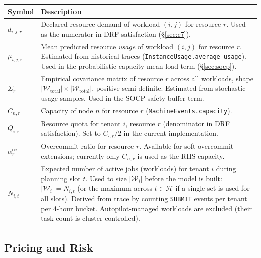 \documentclass[11pt,a4paper]{article}
\newcommand{\cW}{\mathcal{W}}           %
\newcommand{\cH}{\mathcal{H}}           %
\begin{document}
\begin{longtable}{@{}p{2.2cm}p{11.5cm}@{}}
  \toprule
  \textbf{Symbol} & \textbf{Description} \\
  \midrule
  \endhead
  $d_{i,j,r}$   & Declared resource demand of workload $(i,j)$ for resource $r$.
                   Used as the numerator in DRF satisfaction (\S\ref{sec:c7}). \\[4pt]
  $\mu_{i,j,r}$ & Mean predicted resource \emph{usage} of workload $(i,j)$ for
                   resource $r$.  Estimated from historical traces
                   (\texttt{InstanceUsage.average\_usage}).
                   Used in the probabilistic capacity mean-load term (\S\ref{sec:socp}). \\[4pt]
  $\Sigma_r$    & Empirical covariance matrix of resource $r$ across all workloads,
                   shape $|\cW_{\text{total}}|\times|\cW_{\text{total}}|$, positive
                   semi-definite.  Estimated from stochastic usage samples.
                   Used in the SOCP safety-buffer term. \\[4pt]
  $C_{n,r}$     & Capacity of node $n$ for resource $r$
                   (\texttt{MachineEvents.capacity}). \\[4pt]
  $Q_{i,r}$     & Resource quota for tenant $i$, resource $r$
                   (denominator in DRF satisfaction).
                   Set to $C_{\cdot,r}/2$ in the current implementation. \\[4pt]
  $\alpha_r^{\text{oc}}$ & Overcommit ratio for resource $r$.  Available for
                   soft-overcommit extensions; currently only $C_{n,r}$ is used
                   as the RHS capacity. \\[4pt]
  $N_{i,t}$      & Expected number of active jobs (workloads) for tenant $i$
                   during planning slot $t$.  Used to size $|\cW_i|$ before the
                   model is built: $|\cW_i| = N_{i,t}$ (or the maximum across
                   $t\in\cH$ if a single set is used for all slots).
                   Derived from trace by counting \texttt{SUBMIT} events per
                   tenant per 4-hour bucket.  Autopilot-managed workloads are
                   excluded (their task count is cluster-controlled). \\
  \bottomrule
\end{longtable}

\subsection{Pricing and Risk}
\end{document}
